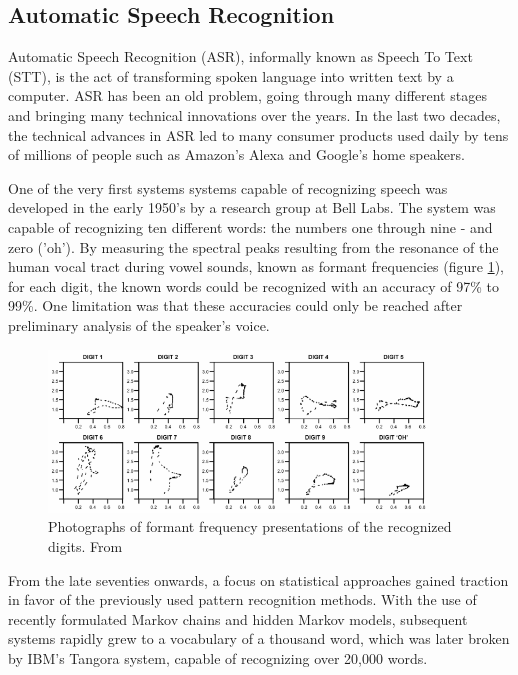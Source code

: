 \documentclass[twoside]{uva-inf-bachelor-thesis}
\begin{document}
\subsection{Automatic Speech Recognition}
Automatic Speech Recognition (ASR), informally known as Speech To Text (STT), is the act of transforming spoken language into written text by a computer. ASR has been an old problem, going through many different stages and bringing many technical innovations over the years. 
In the last two decades, the technical advances in ASR led to many consumer products used daily by tens of millions of people such as Amazon's Alexa and Google's home speakers.

One of the very first systems systems capable of recognizing speech was developed in the early 1950's by a research group at Bell Labs. The system was capable of recognizing ten different words: the numbers one through nine - and zero ('oh'). By measuring the spectral peaks resulting from the resonance of the human vocal tract during vowel sounds, known as formant frequencies (figure \ref{fig:ff}), for each digit, the known words could be recognized with an accuracy of 97\% to 99\%. One limitation was that these accuracies could only be reached after preliminary analysis of the speaker's voice. \cite{davis1952automatic, Juang05}

\begin{figure}[h]
    \centering
    \includegraphics[width=0.9\textwidth]{images/formantFrequencies.png}
    \caption{Photographs of formant frequency presentations of the recognized digits. From \cite{davis1952automatic}}
    \label{fig:ff}
\end{figure}


From the late seventies onwards, a focus on statistical approaches gained traction in favor of the previously used pattern recognition methods. With the use of recently formulated Markov chains and hidden Markov models, subsequent systems rapidly grew to a vocabulary of a thousand word, which was later broken by IBM's Tangora system, capable of recognizing over 20,000 words. \cite{Juang05}
\end{document}
